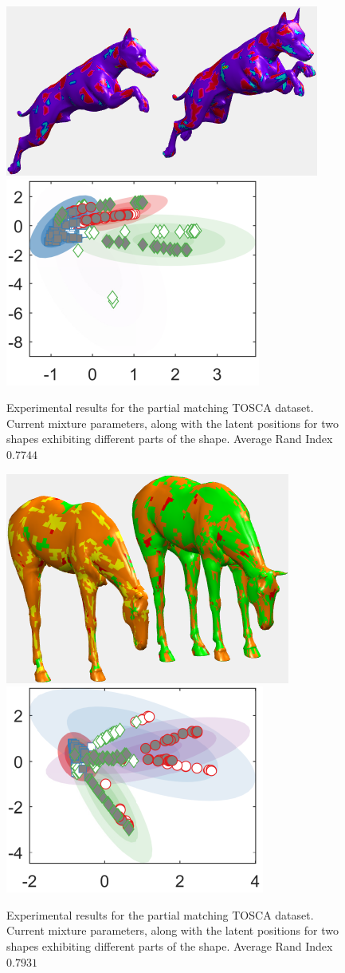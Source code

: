 \documentclass[]{article}
\begin{document}
\begin{figure}[ht!]
	\centering
	
	\includegraphics[width=0.5\linewidth]{img/partialDog1MVMMexp1}
	\includegraphics[width=0.35\linewidth]{img/partialDog1MVMMexp3}
	\caption{Experimental results for the partial matching TOSCA dataset. Current mixture parameters, along with the latent positions for two shapes exhibiting different parts of the shape. Average Rand Index $0.7744$ }
\end{figure}

\begin{figure}[ht!]
	\centering
	
	\includegraphics[width=0.5\linewidth]{img/partialHorse1MVMMexp1}
	\includegraphics[width=0.35\linewidth]{img/partialHorse1MVMMexp3}
	\caption{Experimental results for the partial matching TOSCA dataset. Current mixture parameters, along with the latent positions for two shapes exhibiting different parts of the shape. Average Rand Index $0.7931$ }
\end{figure}
\end{document}
